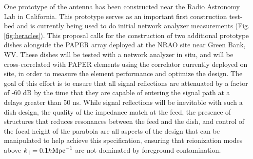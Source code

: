\documentclass[preprint]{aastex}
\begin{document}
One prototype of the antenna has been constructed near the Radio Astronomy Lab in California. 
This prototype serves as an important first construction test-bed and is currently being used to do 
initial network analyzer measurements (Fig. \ref{fig:heracles}).
This proposal calls for the construction of two additional prototype dishes alongside
the PAPER array deployed at the NRAO site near Green Bank, WV.
These dishes will be tested
with a network analyzer in situ, and will be cross-correlated with PAPER elements using
the correlator currently deployed on site, in order to measure
the element performance and optimize the design.  The goal of this effort is to ensure
that all signal reflections
are attenuated by a factor of -60 dB by the time that they are capable of entering the signal path
at a delays greater than 50 ns.  While signal reflections will be inevitable with such a dish
design, the quality of the impedance match at the feed,
the presence of structures that reduces resonances between
the feed and the dish, and control of the focal height of the parabola are all aspects
of the design that can
be manipulated to help achieve this specification, ensuring that reionization modes above
$k_\parallel=0.1h {\rm Mpc}^{-1}$ are not dominated by foreground contamination.
\end{document}
